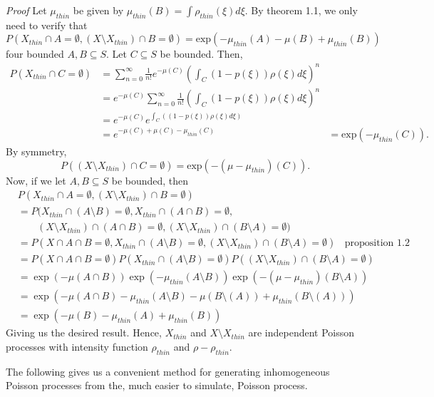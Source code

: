 \documentclass[12pt,twoside]{reedthesis}
\begin{document}
  \emph{Proof} Let \(\mu_{thin}\) be given by
  \(\mu_{thin}(B) = \int \rho_{thin} (\xi) d\xi\). By theorem 1.1, we only
  need to verify that
  \[P(X_{thin} \cap A = \emptyset, ( X\setminus X_{thin} ) \cap B = \emptyset ) = \text{exp}(-\mu_{thin}(A) - \mu(B) + \mu_{thin}(B)) \]
  four bounded \(A, B \subseteq S\). Let \(C\subseteq S\) be bounded.
  Then,\[
  \begin{aligned}
  P(X_{thin} \cap C = \emptyset ) &= \sum_{n=0}^\infty \frac{1}{n!} e^{-\mu(C)} (\int_C (1 - p(\xi))\rho(\xi) d\xi)^n \\
  &= e^{-\mu(C)}\sum_{n=0}^\infty \frac{1}{n!}(\int_C (1-p(\xi))\rho(\xi)d\xi)^n\\
  &= e^{-\mu(C)}e^{\int_C ((1-p(\xi))\rho(\xi)d\xi)}\\
  &= e^{-\mu(C) + \mu(C) - \mu_{thin}(C)}
  &= \text{exp}(-\mu_{thin}(C)).
  \end{aligned}
  \] By symmetry,
  \[P((X\setminus X_{thin}) \cap C = \emptyset) = \text{exp}(-(\mu - \mu_{thin})(C)).\]
  Now, if we let \(A, B \subseteq S\) be bounded, then \[
  \begin{aligned}
  &P(X_{thin}\cap A = \emptyset, (X\setminus X_{thin})\cap B = \emptyset)\\
  &= P(X_{thin} \cap (A\setminus B) = \emptyset, X_{thin} \cap (A\cap B) = \emptyset, \\ 
  &\; \; \; \; \; \; \;   (X\setminus X_{thin}) \cap (A \cap B) = \emptyset, (X\setminus X_{thin}) \cap (B\setminus A) =\emptyset) \\
  &= P(X \cap A \cap B = \emptyset, X_{thin} \cap (A\setminus B) = \emptyset, (X\setminus X_{thin}) \cap(B \setminus A)= \emptyset) \; \; \text{ proposition 1.2}\\
  &= P(X \cap A \cap B = \emptyset)P(X_{thin} \cap (A\setminus B) = \emptyset)P((X\setminus X_{thin}) \cap(B \setminus A)= \emptyset)\\
  &= \exp(-\mu(A\cap B))\exp(-\mu_{thin}(A\setminus B))\exp(-(\mu - \mu_{thin})(B\setminus A))\\
  &= \exp(-\mu(A\cap B) - \mu_{thin}(A\setminus B) - \mu(B\setminus(A)) + \mu_{thin}(B\setminus(A))) \\
  &= \exp(-\mu(B) - \mu_{thin}(A) +\mu_{thin}(B))
  \end{aligned}
  \] Giving us the desired result. Hence, \(X_{thin}\) and
  \(X\setminus X_{thin}\) are independent Poisson processes with intensity
  function \(\rho_{thin}\) and \(\rho - \rho_{thin}\).
  
  The following gives us a convenient method for generating inhomogeneous
  Poisson processes from the, much easier to simulate, Poisson process.
  
\end{document}

